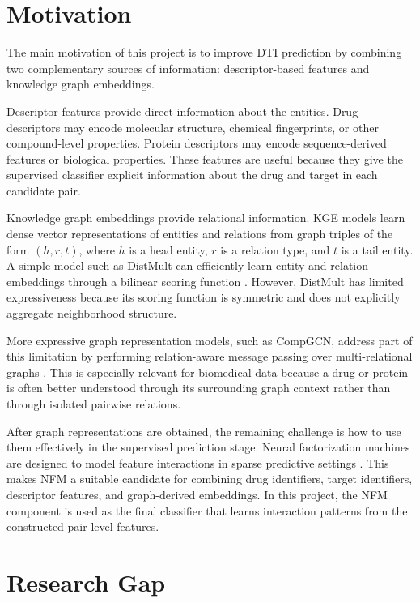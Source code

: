 \section{Motivation}

The main motivation of this project is to improve DTI prediction by combining
two complementary sources of information: descriptor-based features and
knowledge graph embeddings.

Descriptor features provide direct information about the entities. Drug
descriptors may encode molecular structure, chemical fingerprints, or other
compound-level properties. Protein descriptors may encode sequence-derived
features or biological properties. These features are useful because they give
the supervised classifier explicit information about the drug and target in each
candidate pair.

Knowledge graph embeddings provide relational information. KGE models learn
dense vector representations of entities and relations from graph triples of
the form $(h,r,t)$, where $h$ is a head entity, $r$ is a relation type, and $t$
is a tail entity. A simple model such as DistMult can efficiently learn entity
and relation embeddings through a bilinear scoring function
\cite{yang2015embedding}. However, DistMult has limited expressiveness because
its scoring function is symmetric and does not explicitly aggregate
neighborhood structure.

More expressive graph representation models, such as CompGCN, address part of
this limitation by performing relation-aware message passing over
multi-relational graphs \cite{vashishth2020composition}. This is especially
relevant for biomedical data because a drug or protein is often better
understood through its surrounding graph context rather than through isolated
pairwise relations.

After graph representations are obtained, the remaining challenge is how to use
them effectively in the supervised prediction stage. Neural factorization
machines are designed to model feature interactions in sparse predictive
settings \cite{he2017neural}. This makes NFM a suitable candidate for combining
drug identifiers, target identifiers, descriptor features, and graph-derived
embeddings. In this project, the NFM component is used as the final classifier
that learns interaction patterns from the constructed pair-level features.

\section{Research Gap}

